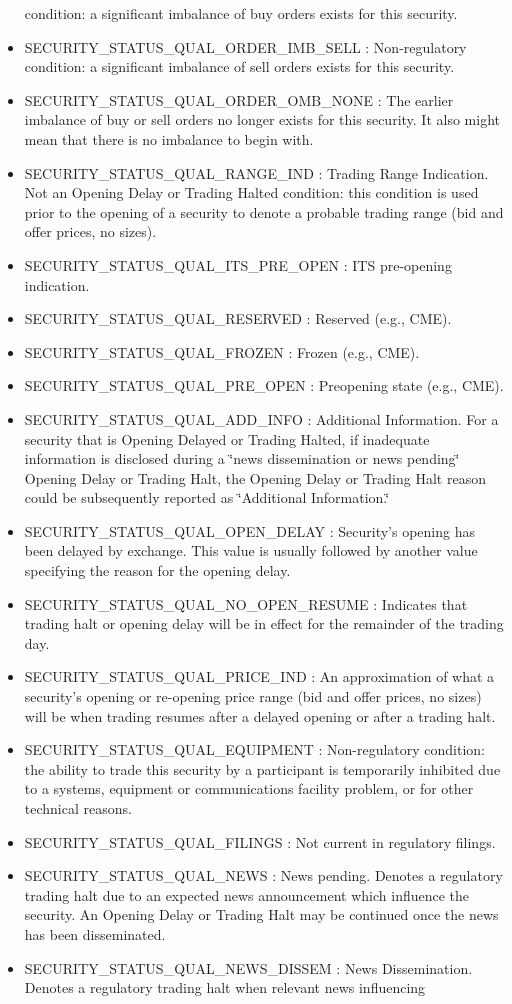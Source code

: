 \begin{itemize}
condition: a significant imbalance of buy orders exists for this security. \item SECURITY\_\-STATUS\_\-QUAL\_\-ORDER\_\-IMB\_\-SELL : Non-regulatory condition: a significant imbalance of sell orders exists for this security. \item SECURITY\_\-STATUS\_\-QUAL\_\-ORDER\_\-OMB\_\-NONE : The earlier imbalance of buy or sell orders no longer exists for this security. It also might mean that there is no imbalance to begin with. \item SECURITY\_\-STATUS\_\-QUAL\_\-RANGE\_\-IND : Trading Range Indication. Not an Opening Delay or Trading Halted condition: this condition is used prior to the opening of a security to denote a probable trading range (bid and offer prices, no sizes). \item SECURITY\_\-STATUS\_\-QUAL\_\-ITS\_\-PRE\_\-OPEN : ITS pre-opening indication. \item SECURITY\_\-STATUS\_\-QUAL\_\-RESERVED : Reserved (e.g., CME). \item SECURITY\_\-STATUS\_\-QUAL\_\-FROZEN : Frozen (e.g., CME). \item SECURITY\_\-STATUS\_\-QUAL\_\-PRE\_\-OPEN : Preopening state (e.g., CME). \item SECURITY\_\-STATUS\_\-QUAL\_\-ADD\_\-INFO : Additional Information. For a security that is Opening Delayed or Trading Halted, if inadequate information is disclosed during a \char`\"{}news dissemination or news pending\char`\"{} Opening Delay or Trading Halt, the Opening Delay or Trading Halt reason could be subsequently reported as \char`\"{}Additional Information.\char`\"{} \item SECURITY\_\-STATUS\_\-QUAL\_\-OPEN\_\-DELAY : Security's opening has been delayed by exchange. This value is usually followed by another value specifying the reason for the opening delay. \item SECURITY\_\-STATUS\_\-QUAL\_\-NO\_\-OPEN\_\-RESUME : Indicates that trading halt or opening delay will be in effect for the remainder of the trading day. \item SECURITY\_\-STATUS\_\-QUAL\_\-PRICE\_\-IND : An approximation of what a security's opening or re-opening price range (bid and offer prices, no sizes) will be when trading resumes after a delayed opening or after a trading halt. \item SECURITY\_\-STATUS\_\-QUAL\_\-EQUIPMENT : Non-regulatory condition: the ability to trade this security by a participant is temporarily inhibited due to a systems, equipment or communications facility problem, or for other technical reasons. \item SECURITY\_\-STATUS\_\-QUAL\_\-FILINGS : Not current in regulatory filings. \item SECURITY\_\-STATUS\_\-QUAL\_\-NEWS : News pending. Denotes a regulatory trading halt due to an expected news announcement which influence the security. An Opening Delay or Trading Halt may be continued once the news has been disseminated. \item SECURITY\_\-STATUS\_\-QUAL\_\-NEWS\_\-DISSEM : News Dissemination. Denotes a regulatory trading halt when relevant news influencing 
\end{itemize}
